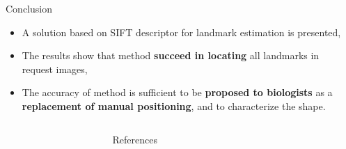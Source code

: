 \documentclass{LaBRI_poster}
\begin{document}
\begin{frame}[t]
\begin{columns}[t]
\begin{column}{\onecolwidth}
\begin{block}{Conclusion}
	\begin{itemize}
		\item A solution based on SIFT descriptor for landmark estimation is presented,
		\item The results show that method \textbf{succeed in locating} all landmarks in  request images,
		\item The accuracy of method is sufficient to be \textbf{proposed to biologists} as a \textbf{replacement of manual positioning}, and to characterize the shape.
	\end{itemize}
\end{block}
\end{column}

\begin{column}{\sepwidth}\end{column} %

\end{columns}

\begin{columns}[t] 

\begin{column}{\sepwidth}\end{column} %

\begin{column}{\onecolwidth}
\begin{block}{References}
	\printbibliography
\end{block}

\end{column}

\begin{column}{\sepwidth}\end{column} %

\end{columns}


\end{frame}
\end{document}
